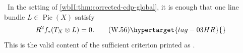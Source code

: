 \begin{corollary}\hypertarget{tag-03DT}{}\label{wbII:cor:corrected-cdp-relative}

\label{wbII:cor:relative}
\ In the setting of
\cref{wbII:thm:corrected-cdp-global}, it is enough that one line bundle
\(L\in\operatorname{Pic}(X)\) satisfy
\[
 R^2f_*(T_X\otimes L)=0.
\tag{W.56}\hypertarget{tag-03HR}{}\label{wbII:eq:W:5.29}
\]
This is the valid content of the sufficient criterion printed as
\cite[Proposition~2.4, p.~680]{CDP20}.
\end{corollary}
